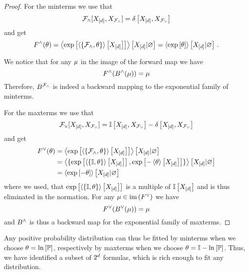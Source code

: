 \begin{proof}
	For the minterms we use that
		\[ \mathcal{F}_{\land}[X_{[d]},X_{\mathcal{F}_{\land}}]  = \delta\left[X_{[d]},X_{\mathcal{F}_{\lor}}\right]\]
	and get
		\[ F^{\land}(\theta)
		= \left\langle 
		\mathrm{exp}\left[\left\langle \{\mathcal{F}_{\land}, \theta\}\right\rangle \left[ X_{[d]} \right]\right]
		\right\rangle \left[ X_{[d]} | \varnothing \right]
		=
		\left\langle \mathrm{exp}\left[\theta\right]\right\rangle \left[ X_{[d]} | \varnothing \right] \, .
		\]

	We notice that for any $\mu$ in the image of the forward map we have
		\[ F^{\land}(B^{\land}(\mu)) = \mu \]
	Therefore, $B^{\mathcal{F}_{\land}}$ is indeed a backward mapping to the exponential family of minterms.

	For the maxterms we use that
		\[ \mathcal{F}_{\lor}[X_{[d]},X_{\mathcal{F}_{\lor}}] = \mathbb{I}\left[X_{[d]},X_{\mathcal{F}_{\lor}}\right]-\delta\left[X_{[d]},X_{\mathcal{F}_{\lor}}\right] \]
	and get
	\begin{align*}
		F^{\lor}(\theta)
		& = \left\langle 
		\mathrm{exp}\left[\left\langle \{\mathcal{F}_{\land}, \theta\}\right\rangle \left[ X_{[d]} \right]\right]
		\right\rangle \left[ X_{[d]} | \varnothing \right] \\
		& = \left\langle \{
		\mathrm{exp}\left[\left\langle \{\mathbb{I}, \theta\}\right\rangle \left[ X_{[d]} \right]\right],
		\mathrm{exp}\left[-\left\langle \theta\right\rangle \left[ X_{[d]} \right]\right] \}
		\right\rangle \left[ X_{[d]} | \varnothing \right] \\
		& = \left\langle 
		\mathrm{exp}\left[-\theta\right]
		\right\rangle \left[ X_{[d]} | \varnothing \right]
	\end{align*}
	where we used, that $\mathrm{exp}\left[\left\langle \{\mathbb{I}, \theta\}\right\rangle \left[ X_{[d]} \right]\right]$ is a multiple of $\mathbb{I}\left[X_{[d]}\right]$ and is thus eliminated in the normation.
	For any $\mu\in\mathrm{im}\left(F^{\lor}\right)$ we have
		\[ F^{\lor}(B^{\lor}(\mu) )
		= \mu
		\]
	and $B^{\land}$ is thus a backward map for the exponential family of maxterms.
\end{proof}

Any positive probability distribution can thus be fitted by minterms when we choose $\theta=\ln \left[ \mathbb{P} \right]$, respectively by maxterms when we choose $\theta=\mathbb{I}-\ln \left[ \mathbb{P} \right]$.
Thus, we have identified a subset of $2^{d}$ formulas, which is rich enough to fit any distribution.





